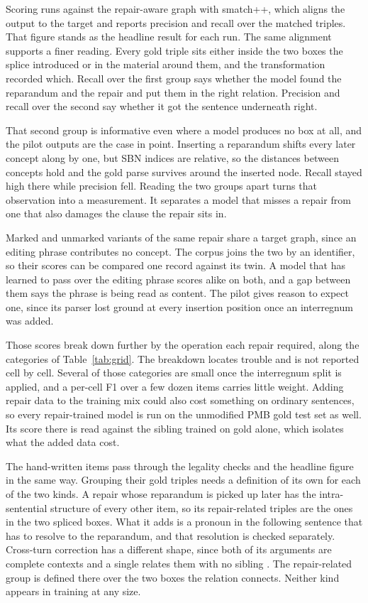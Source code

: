 \documentclass{article}
\begin{document}
Scoring runs against the repair-aware graph with smatch++, which aligns the
output to the target and reports precision and recall over the matched triples.
That figure stands as the headline result for each run. The same alignment
supports a finer reading. Every gold triple sits either inside the two boxes the
splice introduced or in the material around them, and the transformation recorded
which. Recall over the first group says whether the model found the reparandum
and the repair and put them in the right relation. Precision and recall over the
second say whether it got the sentence underneath right.

That second group is informative even where a model produces no
 box at all, and the pilot outputs are the case in point.
Inserting a reparandum shifts every later concept along by one, but SBN indices
are relative, so the distances between concepts hold and the gold parse survives
around the inserted node. Recall stayed high there while precision fell.
Reading the two groups apart turns that observation into a measurement. It
separates a model that misses a repair from one that also damages the clause the
repair sits in.

Marked and unmarked variants of the same repair share a target graph, since an
editing phrase contributes no concept. The corpus joins the two by an identifier,
so their scores can be compared one record against its twin. A model that has
learned to pass over the editing phrase scores alike on both, and a gap between
them says the phrase is being read as content. The pilot gives reason to expect
one, since its parser lost ground at every insertion position once an interregnum
was added.

Those scores break down further by the operation each repair required, along the
categories of Table~\ref{tab:grid}. The breakdown locates trouble and is not
reported cell by cell. Several of those categories are small once the interregnum
split is applied, and a per-cell F1 over a few dozen items carries little weight.
Adding repair data to the training mix could also cost something on ordinary
sentences, so every repair-trained model is run on the unmodified PMB gold test
set as well. Its score there is read against the sibling trained on gold alone,
which isolates what the added data cost.

The hand-written items pass through the legality checks and the headline figure
in the same way. Grouping their gold triples needs a definition of its own for
each of the two kinds. A repair whose reparandum is picked up later has the
intra-sentential structure of every other item, so its repair-related triples are
the ones in the two spliced boxes. What it adds is a pronoun in the following
sentence that has to resolve to the reparandum, and that resolution is checked
separately. Cross-turn correction has a different shape, since both of its
arguments are complete contexts and a single  relates them
with no sibling . The repair-related group is defined there
over the two boxes the relation connects. Neither kind appears in training at any
size.
\end{document}
